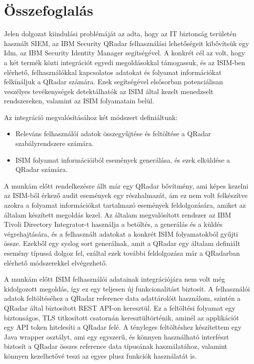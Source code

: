 \chapter{Összefoglalás}
\label{ch:sum}

Jelen dolgozat kiindulási problémáját az adta, hogy az IT biztonság területén használt SIEM, az IBM Security QRadar felhasználási lehetőségeit kibővítsük egy Idm, az IBM Security Identity Manager segítségével. A konkrét cél az volt, hogy a két termék közti integrációt egyedi megoldásokkal támogassuk, és az ISIM-ben elérhető, felhasználókkal kapcsolatos adatokat és folyamat információkat felkínáljuk a QRadar számára. Ezek segítségével elsősorban potenciálisan veszélyes tevékenységek detektálhatók az ISIM által kezelt menedzselt rendszereken, valamint az ISIM folyamatain belül.

Az integráció megvalósításához két módszert definiáltunk:
\begin{itemize}
	\item Releváns felhasználói adatok összegyűjtése és feltöltése a QRadar szabályrendszere számára.
	\item ISIM folyamat információiból események generálása, és ezek elküldése a QRadar számára.
\end{itemize}

A munkám előtt rendelkezésre állt már egy QRadar bővítmény, ami képes kezelni az ISIM-ből érkező audit események egy részhalmazát, ám ez nem volt felkészítve azokra a folyamat információkat tartalmazó események feldolgozására, amiket az általam készített megoldás kezel. Az általam megvalósított rendszer az IBM Tivoli Directory Integrator-t használja a betöltés, a generálás és a küldés végrehajtására, és a felhasznált adatokat a konkrét ISIM folyamatokból gyűjti össze. Ezekből egy syslog sort generálnak, amit a QRadar egy általam definiált esemény típussá dolgoz fel, ezáltal ezek további feldolgozása már a QRadarban elérhető módszerekkel elvégezhető.

A munkám előtt ISIM felhasználói adatainak integrációjára nem volt még kidolgozott megoldás, így ez egy teljesen új funkcionalitást biztosít. A felhasználói adatok feltöltéséhez a QRadar reference data adattárolóit használom, szintén a QRadar által biztosított REST API-on keresztül. Ez a feltöltési folyamat egy biztonságos, TLS titkosított csatornán keresztültörténik, aminél az applikációt egy API token hitelesíti a QRadar felé. A tényleges feltöltéshez készítettem egy Java wrapper osztályt, ami egy egyszerű, és könnyen használható interfészt biztosít a QRadar összes reference data típusának használatához, valamint könnyen kezelhetővé teszi az egyes plusz funkciók használatát is.

